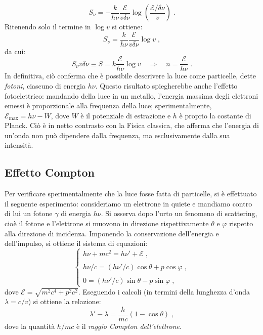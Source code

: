 \documentclass[10pt,a4paper]{report}
\theoremstyle{definition}
\numberwithin{equation}{section}
\begin{document}
$$
S_{\nu}=-\frac{k}{h\nu}\frac{\mathcal{E}}{v\delta\nu}\log\left(\frac{\mathcal{E}/\delta\nu}{v}\right)\;.
$$
Ritenendo solo il termine in $\log v$ si ottiene:
\begin{equation}
S_{\nu}=\frac{k}{h\nu}\frac{\mathcal{E}}{v\delta\nu}\log v\;,
\end{equation}
da cui:
\begin{equation}
S_{\nu}v\delta\nu\equiv S= k\frac{\mathcal{E}}{h\nu}\log v\quad  \Longrightarrow \quad n=\frac{\mathcal{E}}{h\nu}\;.
\end{equation}
In definitiva, ciò conferma che è possibile descrivere la luce come particelle, dette \textit{fotoni}, ciascuno di energia $h\nu$. Questo risultato spiegherebbe anche l'effetto fotoelettrico: mandando della luce in un metallo, l'energia massima degli elettroni emessi è proporzionale alla frequenza della luce; sperimentalmente, $\mathcal{E}_{\mathrm{max}}=h\nu-W$, dove $W$ è il potenziale di estrazione e $h$ è proprio la costante di Planck. Ciò è in netto contrasto con la Fisica classica, che afferma che l'energia di un'onda non può dipendere dalla frequenza, ma esclusivamente dalla sua intensità.
\subsection{Effetto Compton}
Per verificare sperimentalmente che la luce fosse fatta di particelle, si è effettuato il seguente esperimento: consideriamo un elettrone in quiete e mandiamo contro di lui un fotone $\gamma$ di energia $h\nu$. Si osserva dopo l'urto un fenomeno di scattering, cioè il fotone e l'elettrone si muovono in direzione rispettivamente $\theta$ e $\varphi$ rispetto alla direzione di incidenza. Imponendo la conservazione dell'energia e dell'impulso, si ottiene il sistema di equazioni:
$$
\begin{cases}
h\nu + mc^2=h\nu'+\mathcal{E}\;, \\
\\
h\nu/c=(h\nu'/c)\cos\theta+p\cos\varphi\;, \\
\\
0=(h\nu'/c)\sin\theta-p\sin\varphi\;,
\end{cases}
$$
dove $\mathcal{E}=\sqrt{m^2c^4+p^2c^2}$. Eseguendo i calcoli (in termini della lunghezza d'onda $\lambda=c/v$) si ottiene la relazione:
\begin{equation}
\lambda'-\lambda =\frac{h}{mc}(1-\cos\theta)\;,
\end{equation}
dove la quantità $h/mc$ è il \textit{raggio Compton dell'elettrone}.
\end{document}
